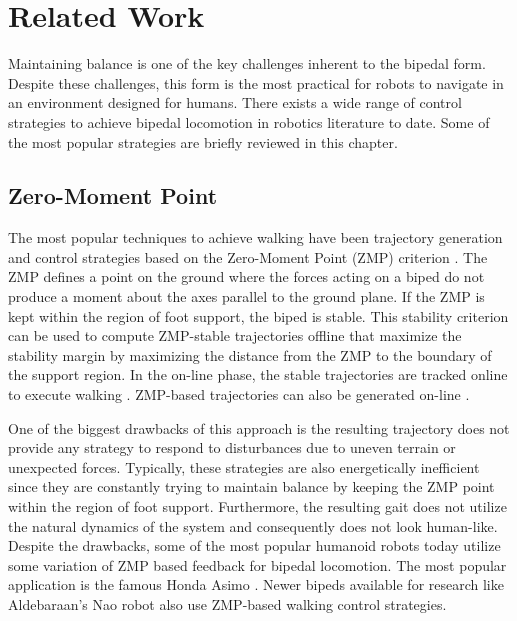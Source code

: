 \chapter{Related Work} %
\label{cha:background}
Maintaining balance is one of the key challenges inherent to the bipedal form. Despite these challenges, this form is the most practical for robots to navigate in an environment designed for humans. There exists a wide range of control strategies to achieve bipedal locomotion in robotics literature to date. Some of the most popular strategies are briefly reviewed in this chapter.  

\section{Zero-Moment Point} %
\label{sec:existing_strategies}
The most popular techniques to achieve walking have been trajectory generation and control strategies based on the Zero-Moment Point (ZMP) criterion \cite{Vukobratovic:2004wy}. The ZMP defines a point on the ground where the forces acting on a biped do not produce a moment about the axes parallel to the ground plane. If the ZMP is kept within the region of foot support, the biped is stable. This stability criterion can be used to compute ZMP-stable trajectories offline that maximize the stability margin by maximizing the distance from the ZMP to the boundary of the support region. In the on-line phase, the stable trajectories are tracked online to execute walking \cite{HuangEtAlTRA2001}.  ZMP-based trajectories can also be generated on-line \cite{KajitaEtAlICRA2003,TakenakaEtAlIROS2009}. 

One of the biggest drawbacks of this approach is the resulting trajectory does not provide any strategy to respond to disturbances due to uneven terrain or unexpected forces. Typically, these strategies \cite{Kajita:1997vr,Kajita:2001fk,Sugihara:2002kq} are also energetically inefficient since they are constantly trying to maintain balance by keeping the ZMP point within the region of foot support. Furthermore, the resulting gait does not utilize the natural dynamics of the system and consequently does not look human-like. Despite the drawbacks, some of the most popular humanoid robots today utilize some variation of ZMP based feedback for bipedal locomotion. The most popular application is the famous Honda Asimo \cite{Hirai1998}. Newer bipeds available for research like Aldebaraan's Nao \cite{Gouaillier2006} robot also use ZMP-based walking control strategies. 

